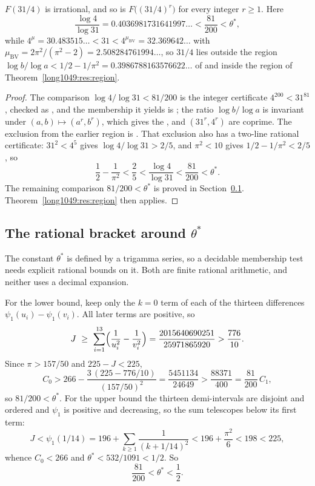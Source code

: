 \documentclass[11pt]{article}
\begin{document}
\begin{theorem}\label{long1049:res:31over4}
$F(31/4)$ is irrational, and so is $F\bigl((31/4)^{r}\bigr)$ for every integer
$r\ge1$.  Here
\[
 \frac{\log4}{\log31}=0.4036981731641997\ldots<\frac{81}{200}<\theta^{*},
\]
while $4^{\mu}=30.483515\ldots<31<4^{\mu_{\mathrm{BV}}}=32.369642\ldots$ with
$\mu_{\mathrm{BV}}=2\pi^{2}/(\pi^{2}-2)=2.508284761994\ldots$, so $31/4$ lies
outside the region $\log b/\log a<1/2-1/\pi^{2}=0.3986788163576622\ldots$ of
\cite[Thm.~2, p.~177]{bv1994} and inside the region of
Theorem~\ref{long1049:res:region}.
\end{theorem}

\begin{proof}
The comparison $\log4/\log31<81/200$ is the integer certificate
$4^{200}<31^{81}$, checked as
, and the membership it yields is
;
the ratio $\log b/\log a$ is invariant under $(a,b)\mapsto(a^{r},b^{r})$, which
gives the
, and $(31^{r},4^{r})$ are coprime.  The exclusion from the earlier
region is
.
That exclusion also has a two-line rational certificate: $31^{2}<4^{5}$ gives
$\log4/\log31>2/5$, and $\pi^{2}<10$ gives $1/2-1/\pi^{2}<2/5$, so
\[
 \frac12-\frac1{\pi^{2}}<\frac25<\frac{\log4}{\log31}<\frac{81}{200}<\theta^{*}.
\]
The remaining comparison $81/200<\theta^{*}$ is proved in
Section~\ref{long1049:sec:regionbracket}.  Theorem~\ref{long1049:res:region} then applies.
\end{proof}

\subsection{The rational bracket around \texorpdfstring{$\theta^{*}$}{theta*}}\label{long1049:sec:regionbracket}

The constant $\theta^{*}$ is defined by a trigamma series, so a decidable
membership test needs explicit rational bounds on it.  Both are finite rational
arithmetic, and neither uses a decimal expansion.

For the lower bound, keep only the $k=0$ term of each of the thirteen
differences $\psi_1(u_i)-\psi_1(v_i)$.  All later terms are positive, so
\[
 J\ \ge\ \sum_{i=1}^{13}\Bigl(\frac1{u_i^{2}}-\frac1{v_i^{2}}\Bigr)
  =\frac{2015640690251}{25971865920}
  >\frac{776}{10}.
\]
Since $\pi>157/50$ and $225-J<225$,
\[
 C_0>266-\frac{3\,(225-776/10)}{(157/50)^{2}}=\frac{5451134}{24649}
 >\frac{88371}{400}=\frac{81}{200}\,C_1,
\]
so $81/200<\theta^{*}$.  For the upper bound the thirteen demi-intervals are
disjoint and ordered and $\psi_1$ is positive and decreasing, so the sum
telescopes below its first term:
\[
 J<\psi_1(1/14)=196+\sum_{k\ge1}\frac1{(k+1/14)^{2}}<196+\frac{\pi^{2}}6<198<225,
\]
whence $C_0<266$ and $\theta^{*}<532/1091<1/2$.  So
\[
 \frac{81}{200}<\theta^{*}<\frac12 .
\]
\end{document}
